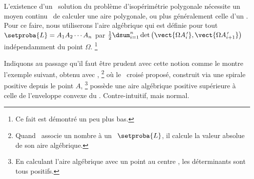 L'existence d'un \ngone\ solution du problème d'isopérimétrie polygonale nécessite un moyen \og continu \fg\ de calculer une aire polygonale, ou plus généralement celle d'un \ncycle.
Pour ce faire, nous utiliserons l'aire algébrique qui est définie pour tout \ncycle\ $\setproba{L} = A_1 A_2 \cdots A_n$ par $\frac12 \dsum_{i=1}^{n} \det \big( \vect{\Omega A^{\,\prime}_i} , \vect{\Omega A^{\,\prime}_{i+1}} \big)$ indépendamment du point $\Omega$.%
\footnote{
    Ce fait est démontré un peu plus bas.
}

Indiquons au passage qu'il faut être prudent avec cette notion comme le montre l'exemple suivant, obtenu avec \geogebra,%
\footnote{
	Quand \geogebra\ associe un nombre à un \ncycle\ $\setproba{L}$, il calcule la valeur absolue de son aire algébrique.
}
où le \ngone\ croisé proposé, construit via une spirale positive depuis le point $A$,%
\footnote{
	En calculant l'aire algébrique avec un point \og au centre \fg, les déterminants sont tous positifs.
} 
possède une aire algébrique positive supérieure à celle de l'enveloppe convexe du \ngone. Contre-intuitif, mais normal.


